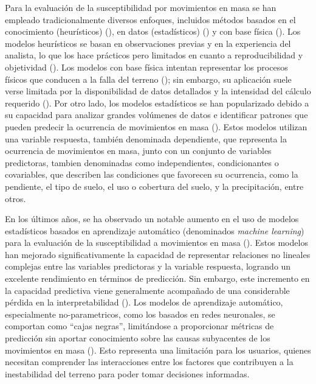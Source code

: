 \documentclass[
  manuscript=article,  
  layout=preprint,  
]{format}
\begin{document}
Para la evaluación de la susceptibilidad por movimientos en masa se han empleado tradicionalmente diversos enfoques, incluidos métodos basados en el conocimiento (heurísticos) (\cite{barredo2000comparing}), en datos (estadísticos) (\cite{korup2014landslide}) y con base física (\cite{montgomery1994}). Los modelos heurísticos se basan en observaciones previas y en la experiencia del analista, lo que los hace prácticos pero limitados en cuanto a reproducibilidad y objetividad (\cite{huang2020comparisons}). Los modelos con base física intentan representar los procesos físicos que conducen a la falla del terreno (\cite{sannino2024deterministic, palacio2020probabilistic}); sin embargo, su aplicación suele verse limitada por la disponibilidad de datos detallados y la intensidad del cálculo requerido (\cite{aristizabal2016shia_landslide, marin2021assessing}). Por otro lado, los modelos estadísticos se han popularizado debido a su capacidad para analizar grandes volúmenes de datos e identificar patrones que pueden predecir la ocurrencia de movimientos en masa (\cite{tehrani2022machine}). Estos modelos utilizan una variable respuesta, también denominada dependiente, que representa la ocurrencia de movimientos en masa, junto con un conjunto de variables predictoras, tambien denominadas como independientes, condicionantes o covariables, que describen las condiciones que favorecen su ocurrencia, como la pendiente, el tipo de suelo, el uso o cobertura del suelo, y la precipitación, entre otros.

En los últimos años, se ha observado un notable aumento en el uso de modelos estadísticos basados en aprendizaje automático (denominados \textit{machine learning}) para la evaluación de la susceptibilidad a movimientos en masa (\cite{tehrani2022machine}). Estos modelos han mejorado significativamente la capacidad de representar relaciones no lineales complejas entre las variables predictoras y la variable respuesta, logrando un excelente rendimiento en términos de predicción. Sin embargo, este incremento en la capacidad predictiva viene generalmente acompañado de una considerable pérdida en la interpretabilidad (\cite{youssef2023landslide}). Los modelos de aprendizaje automático, especialmente no-parametricos, como los basados en redes neuronales, se comportan como “cajas negras”, limitándose a proporcionar métricas de predicción sin aportar conocimiento sobre las causas subyacentes de los movimientos en masa (\cite{ermini2005artificial}). Esto representa una limitación para los usuarios, quienes necesitan comprender las interacciones entre los factores que contribuyen a la inestabilidad del terreno para poder tomar decisiones informadas.
\end{document}
